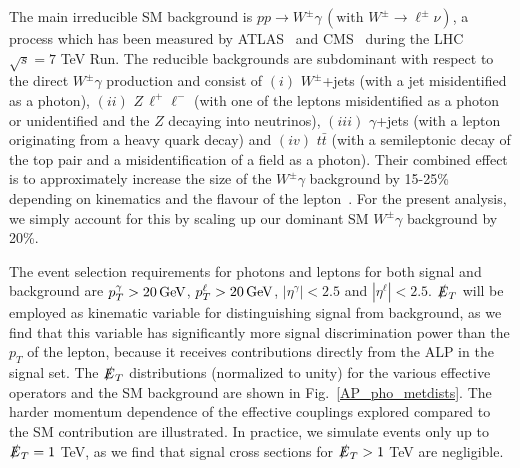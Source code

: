 \documentclass[11pt]{article}
\newcommand{\g}{\gamma}
\newcommand{\n}{\nu}
\newcommand{\ETmiss}{\slashed{E}_T}
\renewcommand{\to}{\rightarrow}
\renewcommand{\[}{\begin{equation}}
\renewcommand{\]}{\end{equation}}
\begin{document}
The main irreducible SM background is $pp\to W^{\pm}\gamma \,( \text{with}\,\, W^{\pm}\to \ell^{\pm}\n)$, a process which has been measured by 
ATLAS~\cite{Aad:2013izg} and CMS~\cite{Chatrchyan:2013fya} during the LHC $\sqrt{s} = 7$ TeV Run. 
The reducible backgrounds are subdominant with respect to the direct $W^\pm\g$ production and consist of $(i)$ $W^{\pm}$+jets (with a jet misidentified as a photon), $(ii)$ $Z\,\ell^+ \ell^-$ (with one of the leptons 
misidentified as a photon or unidentified and the $Z$ decaying into neutrinos), $(iii)$ $\gamma$+jets (with a lepton originating from a heavy quark decay) and $(iv)$
$t\bar{t}$ (with a semileptonic decay of the top pair and a misidentification of a field as a photon). Their combined effect is to approximately increase the size of the $W^{\pm}\gamma$ background by 15-25\% depending on 
kinematics and the flavour of the lepton~\cite{Aad:2013izg,Chatrchyan:2013fya}. For the present analysis, we simply account for this by 
scaling up our dominant SM $W^{\pm}\gamma$ background by 20\%. 


The event selection requirements for photons and leptons for both signal and background are 
$p_T^\gamma > \unit[20]{GeV}$, $p_T^{\ell} > \unit[20]{GeV}$, $|\eta^\gamma| < 2.5$ and $|\eta^{\ell}| < 2.5$. 
$\ETmiss$ will be employed as kinematic variable for distinguishing signal from background, as we find that this variable has significantly more signal discrimination 
power than the $p_T$ of the lepton, because it receives contributions directly from the ALP in the signal set. The $\ETmiss$ distributions (normalized to unity) 
for the various effective operators and the SM background are shown in 
Fig.~\ref{AP_pho_metdists}. The harder momentum dependence of the effective couplings explored compared to the SM contribution are illustrated. 
In practice, we simulate events only up to $\ETmiss = 1$ TeV, as we find that signal cross sections for  $\ETmiss > 1$ TeV are negligible. 
\end{document}
